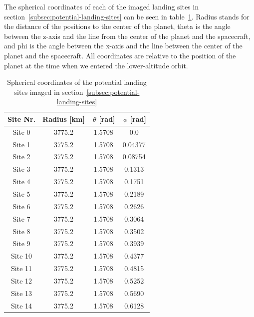 \documentclass[reprint,english,notitlepage]{revtex4-2}
\begin{document}
    The spherical coordinates of each of the imaged landing sites in section~\ref{subsec:potential-landing-sites} can be seen in table~\ref{tab:land_coords}.
    Radius stands for the distance of the positions to the center of the planet, theta is the angle between the z-axis and the line from the center of the planet and the spacecraft, and phi is the angle between the x-axis and the line between the center of the planet and the spacecraft.
    All coordinates are relative to the position of the planet at the time when we entered the lower-altitude orbit.\\
    \begin{table}[h]
        \begin{tabular}{|c|c|c|c|}
            \hline
            Site Nr. & Radius [km] & $\,\theta$ [rad] & $\,\phi$ [rad]\\
            \hline
            Site 0 & 3775.2 & 1.5708 & 0.0\\
            \hline
            Site 1 & 3775.2 & 1.5708 & 0.04377\\
            \hline
            Site 2 & 3775.2 & 1.5708 & 0.08754\\
            \hline
            Site 3 & 3775.2 & 1.5708 & 0.1313\\
            \hline
            Site 4 & 3775.2 & 1.5708 & 0.1751\\
            \hline
            Site 5 & 3775.2 & 1.5708 & 0.2189\\
            \hline
            Site 6 & 3775.2 & 1.5708 & 0.2626\\
            \hline
            Site 7 & 3775.2 & 1.5708 & 0.3064\\
            \hline
            Site 8 & 3775.2 & 1.5708 & 0.3502\\
            \hline
            Site 9 & 3775.2 & 1.5708 & 0.3939\\
            \hline
            Site 10 & 3775.2 & 1.5708 & 0.4377\\
            \hline
            Site 11 & 3775.2 & 1.5708 & 0.4815\\
            \hline
            Site 12 & 3775.2 & 1.5708 & 0.5252\\
            \hline
            Site 13 & 3775.2 & 1.5708 & 0.5690\\
            \hline
            Site 14 & 3775.2 & 1.5708 & 0.6128\\
            \hline
        \end{tabular}
        \caption{Spherical coordinates of the potential landing sites imaged in section~\ref{subsec:potential-landing-sites}}
        \label{tab:land_coords}
    \end{table}
\end{document}

